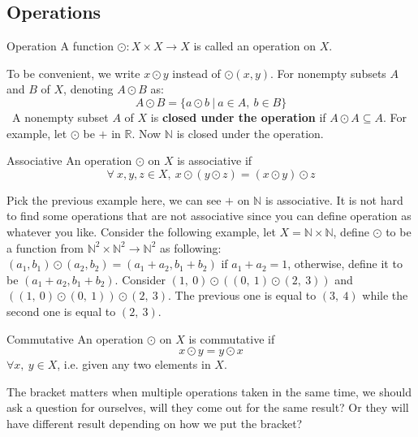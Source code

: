\documentclass{article}
\begin{document}
\subsection{Operations}
\begin{defin}{Operation}
    A function $\odot : X \times X \rightarrow X$ is called an operation on $X$.
\end{defin}
To be convenient, we write $x\odot y$ instead of $\odot(x,y)$. For nonempty subsets $A$ and $B$ of $X$, denoting $A \odot B$ as:
$$
A \odot B = \{a \odot b\ |\ a \in A,\ b \in B\}
$$
\quad\ A nonempty subset $A$ of $X$ is \textbf{closed under the operation} if $A \odot A \subseteq A$. For example, let $\odot$ be
$+$ in $\mathbb{R}$. Now $\mathbb{N}$ is closed under the operation.
\begin{defin}{Associative}
    An operation $\odot$ on $X$ is associative if
    $$
    \forall\ x, y, z \in X,\  x \odot (y \odot z) = (x \odot y) \odot z
    $$
\end{defin}
Pick the previous example here, we can see $+$ on $\mathbb{N}$ is associative. It is not hard to find some operations that are not associative
since you can define operation as whatever you like. Consider the following example, let $X = \mathbb{N} \times \mathbb{N}$, define $\odot$
to be a function from $\mathbb{N}^2 \times \mathbb{N}^2 \rightarrow \mathbb{N}^2$ as following: $(a_1, b_1) \odot (a_2, b_2) = (a_1 + a_2, b_1 + b_2)$
if $a_1 + a_2 = 1$, otherwise, define it to be $(a_1 + a_2, b_1 + b_2)$. Consider $(1,\ 0)\odot \left((0,\ 1) \odot (2,\ 3)\right)$ and $\left((1,\ 0)\odot (0,\ 1)\right)\odot (2,\ 3)$.
The previous one is equal to $(3,\ 4)$ while the second one is equal to $(2,\ 3)$.
\begin{defin}{Commutative}
    An operation $\odot$ on $X$ is commutative if
    $$
    x \odot y = y \odot x
    $$
    $\forall x,\ y \in X$, i.e. given any two elements in $X$.
\end{defin}
The bracket matters when multiple operations taken in the same time, we should ask a question for ourselves, will they come out for the same result? Or they will have different
result depending on how we put the bracket?\\
\end{document}
